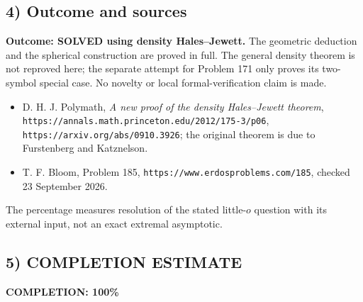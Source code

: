 \subsection{4) Outcome and sources}
\textbf{Outcome: SOLVED using density Hales--Jewett.} The geometric
deduction and the spherical construction are proved in full. The
general density theorem is not reproved here; the separate attempt for
Problem 171 only proves its two-symbol special case. No novelty or
local formal-verification claim is made.
\begin{itemize}
\item D. H. J. Polymath, \emph{A new proof of the density Hales--Jewett
theorem}, \texttt{https://annals.math.princeton.edu/2012/175-3/p06},
\texttt{https://arxiv.org/abs/0910.3926}; the original theorem is due
to Furstenberg and Katznelson.
\item T. F. Bloom, Problem 185,
\texttt{https://www.erdosproblems.com/185}, checked 23 September 2026.
\end{itemize}
The percentage measures resolution of the stated little-$o$ question
with its external input, not an exact extremal asymptotic.
\subsection{5) COMPLETION ESTIMATE}
\textbf{COMPLETION: 100\%}
